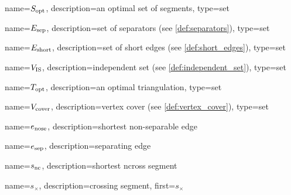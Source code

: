 {
  name={\ensuremath{S_\textnormal{opt}}},
  description={an optimal set of segments},
  type={set}
}

{
  name={\ensuremath{E_\textnormal{sep}}},
  description={set of separators (see \cref{def:separators})},
  type={set}
}

{
  name={\ensuremath{E_\textnormal{short}}},
  description={set of short edges (see \cref{def:short_edges})},
  type={set}
}

{
  name={\ensuremath{V_\textnormal{IS}}},
  description={independent set (see \cref{def:independent_set})},
  type={set}
}

{
  name={\ensuremath{T_\textnormal{opt}}},
  description={an optimal triangulation},
  type={set}
}

{
  name={\ensuremath{V_\textnormal{cover}}},
  description={vertex cover (see \cref{def:vertex_cover})},
  type={set}
}

{
  name={\ensuremath{e_\textnormal{nose}}},
  description={shortest non-separable edge}
}

{
  name={\ensuremath{e_\textnormal{sep}}},
  description={separating edge}
}

{
  name={\ensuremath{s_\textnormal{nc}}},
  description={shortest \gls{ncross} segment}
}

{
  name={\ensuremath{s_{\times}}},
  description={crossing segment},
  first={\ensuremath{s_{\times}}}
}
